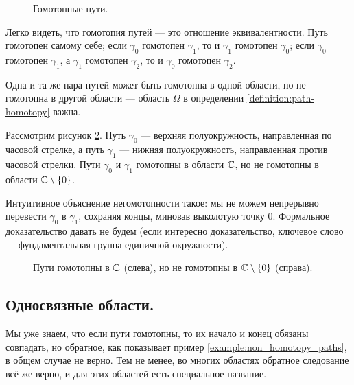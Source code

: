 \documentclass[../complex-analysis.tex]{subfiles}
\begin{document}
\begin{figure}[ht]
 \centering
 \caption{Гомотопные пути.}
 \label{fig:path-homptopy}
\end{figure}

\begin{remrk*}
 Легко видеть, что гомотопия путей --- это отношение эквивалентности. Путь гомотопен самому себе; если $ \gamma_0 $ гомотопен $ \gamma_1 $, то и $ \gamma_1 $ гомотопен $ \gamma_0 $; если $ \gamma_0 $ гомотопен $ \gamma_1 $, а $ \gamma_1 $ гомотопен $ \gamma_2 $, то и $ \gamma_0 $ гомотопен $ \gamma_2 $.
\end{remrk*}

\begin{exmpl}
 \label{example:non_homotopy_paths}
 Одна и та же пара путей может быть гомотопна в одной области, но не гомотопна в другой области --- область $\Omega$ в определении \ref{definition:path-homotopy} важна.

 Рассмотрим рисунок \ref{fig:paths-without-homptopy}. Путь $\gamma_0$ --- верхняя полуокружность, направленная по часовой стрелке, а путь $\gamma_1$ ---  нижняя полуокружность, направленная против часовой стрелки. Пути $\gamma_0$ и $\gamma_1$ гомотопны в области $\mathbb{C}$, но не гомотопны в области $\mathbb{C} \setminus \left\{ 0 \right\}$.

 Интуитивное объяснение негомотопности такое: мы не можем непрерывно перевести $\gamma_0$ в $\gamma_1$, сохраняя концы, миновав выколотую точку $0$. Формальное доказательство давать не будем (если интересно доказательство, ключевое слово --- фундаментальная группа единичной окружности).
\end{exmpl}

\begin{figure}[ht]
 \centering
 \caption{Пути гомотопны в $\mathbb{C}$ (слева), но не гомотопны в $\mathbb{C} \setminus \left\{ 0 \right\}$ (справа).}
 \label{fig:paths-without-homptopy}
\end{figure}

\subsection{Односвязные области.}

Мы уже знаем, что если пути гомотопны, то их начало и конец обязаны совпадать, но обратное, как показывает пример \ref{example:non_homotopy_paths}, в общем случае не верно. Тем не менее, во многих областях обратное следование всё же верно, и для этих областей есть специальное название.
\end{document}
